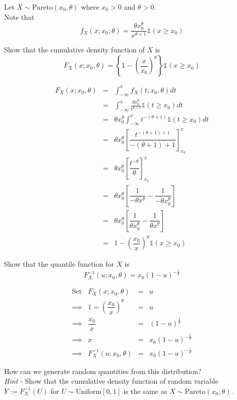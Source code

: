 \documentclass[11pt,a4paper]{article}
\begin{document}
\question
Let $X\sim\text{Pareto}(x_0,\theta)$ where $x_0>0$ and $\theta>0$.\\
Note that
$$f_X(x;x_0;\theta)=\dfrac{\theta x_0^\theta}{x^{\theta+1}}\mathds{1}(x\geq x_0)$$

\qpartnb Show that the cumulative density function of $X$ is
$$F_X(x;x_0,\theta)=\left\{1-\left(\frac{x}{x_0}\right)^\theta\right\}\mathds{1}(x\geq x_0)$$

\apart
\[\begin{array}{rcl}
F_X(x;x_0,\theta)&=&{\displaystyle \int_{-\infty}^xf_X(t;x_0,\theta)dt }\\
&=&{\displaystyle \int_{-\infty}^x\frac{\theta x_0^\theta}{t^{\theta+1}}\mathds{1}(t\geq x_0)dt }\\
&=&\theta x_0^\theta{\displaystyle \int_{-\infty}^x t^{-(\theta+1)}\mathds{1}(t\geq x_0)dt }\\
&=&\theta x_0^\theta\left[\dfrac{t^{-(\theta+1)+1}}{-(\theta+1)+1}\right]_{x_0}^x\\
&=&\theta x_0^\theta\left[\dfrac{t^{-\theta}}{\theta}\right]_{x_0}^x\\
&=&\theta x_0^\theta\left[\dfrac{1}{-\theta x^\theta}-\dfrac{1}{-\theta x_0^\theta}\right]\\
&=&\theta x_0^\theta\left[\dfrac{1}{\theta x_0^\theta}-\dfrac{1}{\theta x^\theta}\right]\\
&=&1-\left(\dfrac{x_0}{x}\right)^\theta\mathds{1}(x\geq x_0)
\end{array}\]

\qpartnb Show that the quantile function for $X$ is
$$F_X^{-1}(u;x_0,\theta)=x_0(1-u)^{-\frac{1}{\theta}}$$

\apart
\[\begin{array}{rrcl}
\text{Set}&F_X(x;x_0,\theta)&=&u\\
\implies&1=\left(\dfrac{x_0}{x}\right)^\theta&=&u\\
\implies&\dfrac{x_0}{x}&=&(1-u)^{\frac{1}{\theta}}\\
\implies&x&=&x_0(1-u)^{-\frac{1}{\theta}}\\
\implies&F_X^{-1}(u;x_0,\theta)&=&x_0(1-u)^{-\frac{1}{\theta}}
\end{array}\]

\qpartnb How can we generate random quantities from this distribution?\\
\textit{Hint} - Show that the cumulative density function of random variable $Y:=F_{X}^{-1}(U)$ for ${U\sim\text{Uniform}[0,1]}$ is the same as $X\sim\text{Pareto}(x_0,\theta)$.\\
\end{document}
